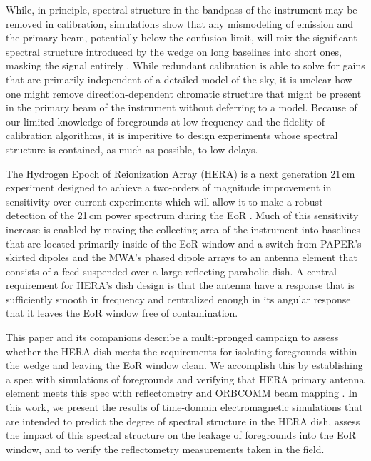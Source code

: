\documentclass[twocolumn]{emulateapj}
\begin{document}
While, in principle, spectral structure in the bandpass of the instrument may be removed in calibration, simulations show that any mismodeling of emission and the primary beam, potentially below the confusion limit, will mix the significant spectral structure introduced by the wedge on long baselines into short ones, masking the signal entirely \citep{Barry:2016}. While redundant calibration \citep{Wieringa:1992,Liu:2010,Zheng:2014} is able to solve for gains that are primarily independent of a detailed model of the sky, it is unclear how one might remove direction-dependent chromatic structure that might be present in the primary beam of the instrument without deferring to a model. Because of our limited knowledge of foregrounds at low frequency and the fidelity of calibration algorithms, it is imperitive to design experiments whose spectral structure is contained, as much as possible, to low delays. 

The Hydrogen Epoch of Reionization Array (HERA) is a next generation 21\,cm experiment designed to achieve a two-orders of magnitude improvement in sensitivity over current experiments which will allow it to make a robust detection of the 21\,cm power spectrum during the EoR \citep{Pober:2014}. Much of this sensitivity increase is enabled by moving the collecting area of the instrument into baselines that are located primarily inside of the EoR window and a switch from PAPER's skirted dipoles and the MWA's phased dipole arrays to an antenna element that consists of a feed suspended over a large reflecting parabolic dish. A central requirement for HERA's dish design is that the antenna have a response that is sufficiently smooth in frequency and centralized enough in its angular response that it leaves the EoR window free of contamination.

This paper and its companions \citep{Neben:2016,Patra:2016,Thyagarajan:2016} describe a multi-pronged campaign to assess whether the HERA dish meets the requirements for isolating foregrounds within the wedge and leaving the EoR window clean. We accomplish this by establishing a spec with simulations of foregrounds \citep{Thyagarajan:2016} and verifying that HERA primary antenna element meets this spec with reflectometry \citep{Patra:2016} and ORBCOMM beam mapping \citep{Neben:2016}. In this work, we present the results of time-domain electromagnetic simulations that are intended to predict the degree of spectral structure in the HERA dish, assess the impact of this spectral structure on the leakage of foregrounds into the EoR window, and to verify the reflectometry measurements taken in the field. 
\end{document}
